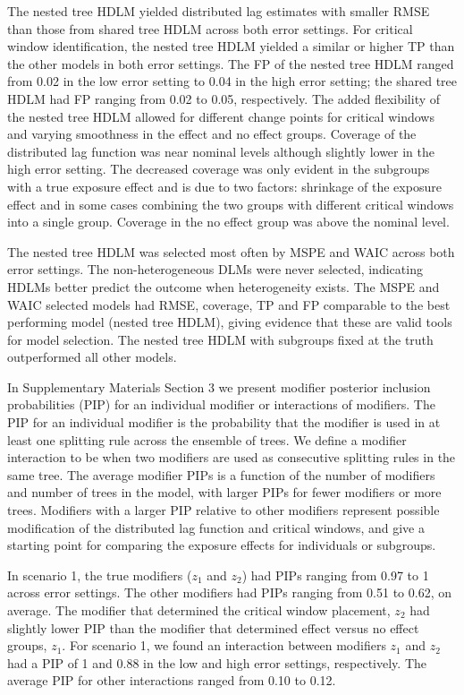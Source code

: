 \documentclass[12pt]{article}
\begin{document}
The nested tree HDLM yielded distributed lag estimates with smaller RMSE than those from shared tree HDLM across both error settings. For critical window identification, the nested tree HDLM yielded a similar or higher TP than the other models in both error settings. The FP of the nested tree HDLM ranged from 0.02 in the low error setting to 0.04 in the high error setting; the shared tree HDLM had FP ranging from 0.02 to 0.05, respectively. The added flexibility of the nested tree HDLM allowed for different change points for critical windows and varying smoothness in the effect and no effect groups. Coverage of the distributed lag function was near nominal levels although slightly lower in the high error setting. The decreased coverage was only evident in the subgroups with a true exposure effect and is due to two factors: shrinkage of the exposure effect and in some cases combining the two groups with different critical windows into a single group.  Coverage in the no effect group was above the nominal level. 

The nested tree HDLM was selected most often by MSPE and WAIC across both error settings. The non-heterogeneous DLMs were never selected, indicating HDLMs better predict the outcome when heterogeneity exists. The MSPE and WAIC selected models had RMSE, coverage, TP and FP comparable to the best performing model (nested tree HDLM), giving evidence that these are valid tools for model selection. The nested tree HDLM with subgroups fixed at the truth outperformed all other models.

In Supplementary Materials Section 3 we present modifier posterior inclusion probabilities (PIP) for an individual modifier or interactions of modifiers. The PIP for an individual modifier is the probability that the modifier is used in at least one splitting rule across the ensemble of trees. We define a modifier interaction to be when two modifiers are used as consecutive splitting rules in the same tree. The average modifier PIPs is a function of the number of modifiers and number of trees in the model, with larger PIPs for fewer modifiers or more trees. Modifiers with a larger PIP relative to other modifiers represent possible modification of the distributed lag function and critical windows, and give a starting point for comparing the exposure effects for individuals or subgroups.

In scenario 1, the true modifiers ($z_1$ and $z_2$) had PIPs ranging from 0.97 to 1 across error settings. The other modifiers had PIPs ranging from 0.51 to 0.62, on average. The modifier that determined the critical window placement, $z_2$ had slightly lower PIP than the modifier that determined effect versus no effect groups, $z_1$. For scenario 1, we found an interaction between modifiers $z_1$ and $z_2$ had a PIP of 1 and 0.88 in the low and high error settings, respectively. The average PIP for other interactions ranged from 0.10 to 0.12.
\end{document}
